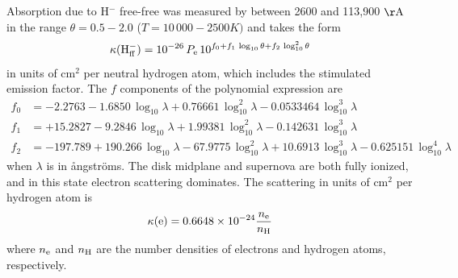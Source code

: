 Absorption due to H$^{-}$ free-free was measured by \citet{BellBerrington87} between 2600 and 113,900 $\rm \AA$ in the range $\theta = 0.5 - 2.0$ ($T = 10\,000 - 2500 K)$ and takes the form
\begin{equation}
    \kappa({\rm H_{ff}^-}) = 10^{-26} \, P_{\rm e} \, 10^{f_0 + f_1 \, \log_{10} \theta + f_2 \, \log_{10}^2 \theta}
\end{equation}
in units of cm$^2$ per neutral hydrogen atom, which includes the stimulated emission factor. The $f$ components of the polynomial expression are
\begin{align}
    f_0 &= -2.2763 - 1.6850 \, \log_{10} \lambda + 0.76661 \, \log_{10}^2 \lambda - 0.0533464 \, \log_{10}^3 \lambda \\
    f_1 &= +15.2827 - 9.2846 \, \log_{10} \lambda + 1.99381 \, \log_{10}^2 \lambda - 0.142631 \, \log_{10}^3 \lambda \\
    f_2 &= -197.789 + 190.266 \, \log_{10} \lambda - 67.9775 \, \log_{10}^2 \lambda + 10.6913 \, \log_{10}^3 \lambda - 0.625151 \, \log_{10}^4 \lambda
\end{align}
when $\lambda$ is in \r{a}ngstr\"oms. The disk midplane and supernova are both fully ionized, and in this state electron scattering dominates. The scattering in units of cm$^{2}$ per hydrogen atom is 
\begin{equation}
\kappa({\rm e}) = 0.6648 \times 10^{-24} \frac{n_{\rm e}}{n_{\rm H}}  \\
\end{equation}
where $n_{\rm e}$ and $n_{\rm H}$ are the number densities of electrons and hydrogen atoms, respectively.

